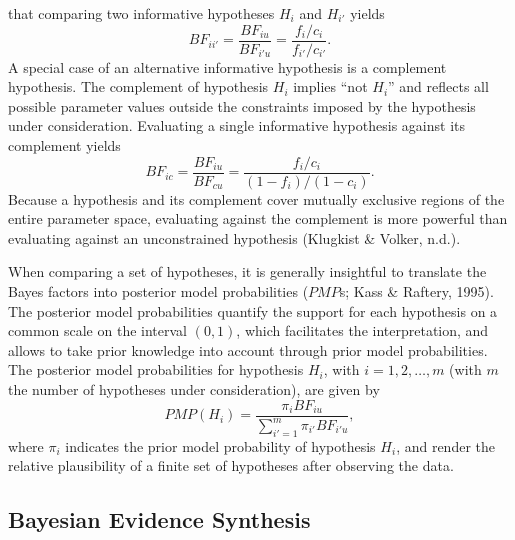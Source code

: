 \documentclass[
]{interact}
\begin{document}
that comparing two informative hypotheses \(H_i\) and \(H_{i'}\) yields
\[
BF_{ii'} = \frac{BF_{iu}}{BF_{i'u}} = \frac{f_i / c_i}{f_{i'}/c_{i'}}.
\] A special case of an alternative informative hypothesis is a
complement hypothesis. The complement of hypothesis \(H_i\) implies
``not \(H_i\)'' and reflects all possible parameter values outside the
constraints imposed by the hypothesis under consideration. Evaluating a
single informative hypothesis against its complement yields \[
BF_{i c} = \frac{BF_{iu}}{BF_{cu}} = \frac{f_i/c_i}{(1 - f_i) / (1 - c_i)}.
\] Because a hypothesis and its complement cover mutually exclusive
regions of the entire parameter space, evaluating against the complement
is more powerful than evaluating against an unconstrained hypothesis
(Klugkist \& Volker, n.d.).

When comparing a set of hypotheses, it is generally insightful to
translate the Bayes factors into posterior model probabilities
(\(PMP\)s; Kass \& Raftery, 1995). The posterior model probabilities
quantify the support for each hypothesis on a common scale on the
interval \((0,1)\), which facilitates the interpretation, and allows to
take prior knowledge into account through prior model probabilities. The
posterior model probabilities for hypothesis \(H_i\), with
\(i = 1, 2, \dots, m\) (with \(m\) the number of hypotheses under
consideration), are given by \[
PMP(H_{i}) = \frac{\pi_i BF_{iu}}{\sum^m_{i'=1} \pi_{i'} BF_{i'u}}, 
\] where \(\pi_i\) indicates the prior model probability of hypothesis
\(H_i\), and render the relative plausibility of a finite set of
hypotheses after observing the data.

\hypertarget{bayesian-evidence-synthesis}{%
\subsection{Bayesian Evidence
Synthesis}\label{bayesian-evidence-synthesis}}
\end{document}
